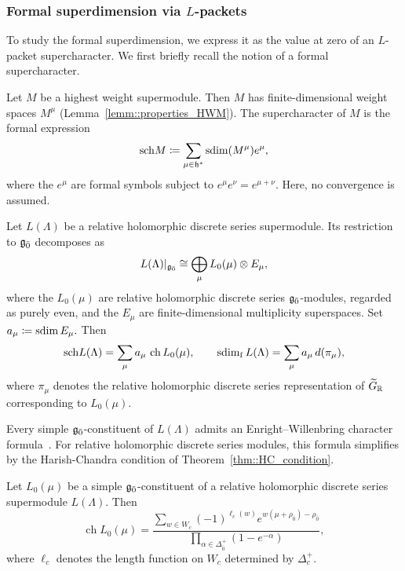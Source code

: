 \subsubsection{Formal superdimension via \texorpdfstring{$L$}{L}-packets}
\label{subsec::L_packet}

To study the formal superdimension, we express it as the value at zero of an $L$-packet supercharacter. We first briefly recall the notion of a formal supercharacter. 


Let $M$ be a highest weight supermodule. Then $M$ has finite-dimensional weight spaces $M^{\mu}$ (Lemma~\ref{lemm::properties_HWM}). The supercharacter of $M$ is the formal expression
\begin{equation}
{\operatorname{sch}} M
\coloneqq
\sum_{\mu\in{\mathfrak h}^\ast}\operatorname{sdim}(M^\mu)e^\mu,
\end{equation}
where the $e^\mu$ are formal symbols subject to $e^\mu e^\nu=e^{\mu+\nu}$. Here, no convergence is assumed.


Let $L(\Lambda)$ be a relative holomorphic discrete series supermodule. Its restriction to ${\mathfrak{g}_{\bar{0}}}$ decomposes as
\begin{equation}
L(\Lambda)|_{{\mathfrak{g}_{\bar{0}}}}
\cong
\bigoplus_\mu L_0(\mu)\otimes E_\mu,
\end{equation}
where the $L_0(\mu)$ are relative holomorphic discrete series ${\mathfrak{g}_{\bar{0}}}$-modules, regarded as purely even, and the $E_\mu$ are finite-dimensional multiplicity superspaces. Set
$
a_\mu\coloneqq\operatorname{sdim} E_\mu.
$
Then
\begin{equation}
{\operatorname{sch}} L(\Lambda)
=
\sum_\mu a_\mu\,\operatorname{ch}L_0(\mu),
\qquad
\operatorname{sdim}_{\mathrm f} L(\Lambda)
=
\sum_\mu a_\mu\,d(\pi_\mu),
\end{equation}
where $\pi_\mu$ denotes the relative holomorphic discrete series representation of $\widetilde{G}_{{\mathbb R}}$ corresponding to $L_0(\mu)$.

Every simple ${\mathfrak{g}_{\bar{0}}}$-constituent of $L(\Lambda)$ admits an Enright--Willenbring character formula~\cite{Enright_Willenbring}. For relative holomorphic discrete series modules, this formula simplifies by the Harish-Chandra condition of Theorem~\ref{thm::HC_condition}.

\begin{lemma}\label{lemm::character_formula_L_0_relative}
Let $L_0(\mu)$ be a simple ${\mathfrak{g}_{\bar{0}}}$-constituent of a relative holomorphic discrete series supermodule $L(\Lambda)$. Then
\begin{equation*}
\operatorname{ch}L_0(\mu)
=
\frac{
\sum_{w\in W_c}
(-1)^{\ell_c(w)}
e^{w(\mu+\rho_{\bar0})-\rho_{\bar0}}
}{
\prod_{\alpha\in\Delta_{\bar0}^+}
(1-e^{-\alpha})
},
\end{equation*}
where $\ell_c$ denotes the length function on $W_c$ determined by $\Delta_c^+$.
\end{lemma}

